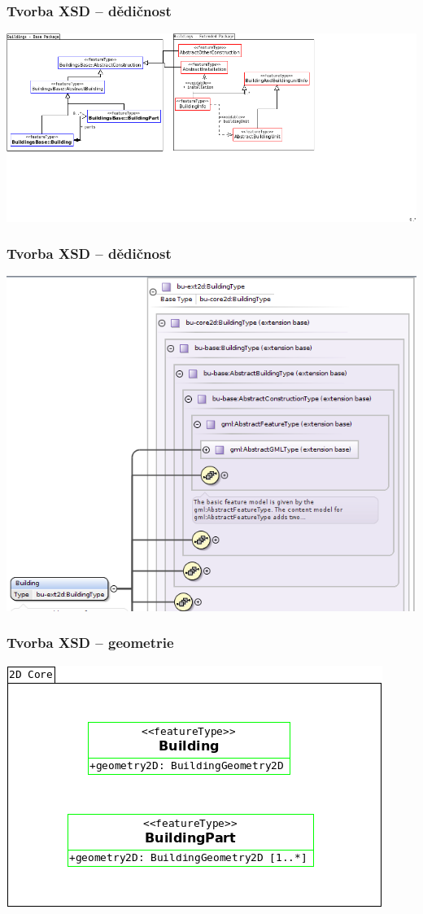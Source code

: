 \begin{frame}
\frametitle{Tvorba XSD -- dědičnost}
\begin{center}
\includegraphics[scale=0.45]{obrazky/BU_ExtDedicnost.png}
\end{center}
\end{frame}

\begin{frame}
\frametitle{Tvorba XSD -- dědičnost}
\begin{center}
\includegraphics[scale=0.35]{obrazky/BU_oXygen.png}
\end{center}
\end{frame}

\begin{frame}
\frametitle{Tvorba XSD -- geometrie}
\begin{center}
\includegraphics[scale=0.45]{obrazky/geometrie.png}
\end{center}
\end{frame}

